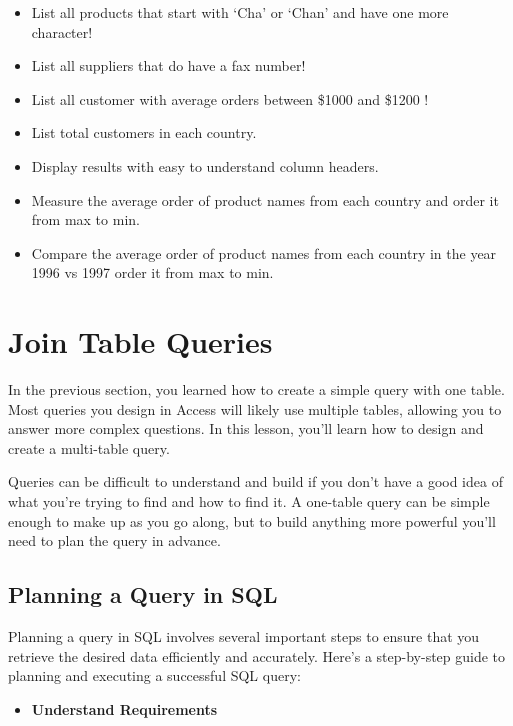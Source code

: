 \documentclass[
]{book}
\providecommand{\tightlist}{%
  \setlength{\itemsep}{0pt}\setlength{\parskip}{0pt}}
\begin{document}
\begin{itemize}
\item
  List all products that start with `Cha' or `Chan' and have one more character!
\item
  List all suppliers that do have a fax number!
\item
  List all customer with average orders between \$1000 and \$1200 !
\item
  List total customers in each country.
\item
  Display results with easy to understand column headers.
\item
  Measure the average order of product names from each country and order it from max to min.
\item
  Compare the average order of product names from each country in the year 1996 vs 1997 order it from max to min.
\end{itemize}

\hypertarget{join-table-queries}{%
\chapter{Join Table Queries}\label{join-table-queries}}

In the previous section, you learned how to create a simple query with one table. Most queries you design in Access will likely use multiple tables, allowing you to answer more complex questions. In this lesson, you'll learn how to design and create a multi-table query.

Queries can be difficult to understand and build if you don't have a good idea of what you're trying to find and how to find it. A one-table query can be simple enough to make up as you go along, but to build anything more powerful you'll need to plan the query in advance.

\hypertarget{planning-a-query-in-sql}{%
\section{Planning a Query in SQL}\label{planning-a-query-in-sql}}

Planning a query in SQL involves several important steps to ensure that you retrieve the desired data efficiently and accurately. Here's a step-by-step guide to planning and executing a successful SQL query:

\begin{itemize}
\tightlist
\item
  \textbf{Understand Requirements}
\end{itemize}
\end{document}
